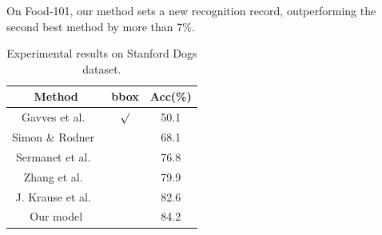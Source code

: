\documentclass[10pt,twocolumn,letterpaper]{article}
\begin{document}

On Food-101, our method sets a new recognition record, outperforming the second best method by more than 7\%.

\begin{table}[t]
\centering
\begin{tabular}
{c||c|c}\hline
Method &  bbox & Acc(\%) \\\hline\hline
Gavves et al.~\cite{bd13} & $\surd$ &   50.1 \\
Simon \& Rodner~\cite{bd28}  &   & 68.1  \\
Sermanet et al.~\cite{bd3}  &  &  76.8  \\
Zhang et al.~\cite{bd27}  &  &  79.9  \\
J. Krause et al.~\cite{bd21} &  & 82.6 \\ \hline
Our model & & 84.2 \\ \hline
\end{tabular}
\caption{Experimental results on Stanford Dogs dataset.}
\label{tab:dog}
\end{table}
\end{document}
